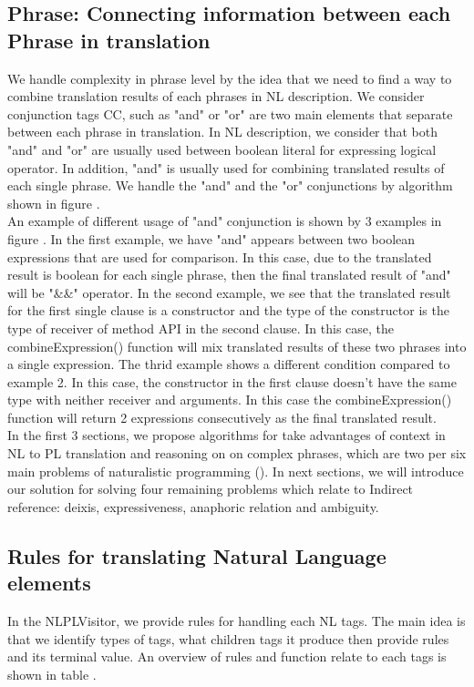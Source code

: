 \subsection{Phrase: Connecting information between each Phrase in translation}
We handle complexity in phrase level by the idea that we need to find a way to combine translation results of each phrases in NL description. We consider conjunction tags CC, such as "and" or "or" are two main elements that separate between each phrase in translation.  In NL description, we consider that both "and" and "or" are usually used between boolean literal for expressing logical operator. In addition, "and" is usually used for combining translated results of each single phrase. We handle the "and" and the "or" conjunctions by algorithm shown in figure \cite{}. \\
An example of different usage of "and" conjunction is shown by 3 examples in figure \cite{}. In the first example, we have "and" appears between two  boolean expressions that are used for comparison. In this case, due to the translated result is boolean for each single phrase, then the final translated result of "and" will be "\&\&" operator. In the second example, we see that the translated result for the first single clause is a constructor and the type of the constructor is the type of receiver of method API in the second clause. In this case, the combineExpression() function will mix translated results of these two phrases into a single expression. The thrid example shows a different condition compared to example 2. In this case, the constructor in the first clause doesn't have the same type with neither receiver and arguments. In this case the combineExpression() function will return 2 expressions consecutively as the final translated result.  \\
In the first 3 sections, we propose algorithms for take advantages of context in NL to PL translation and reasoning on on complex phrases, which are two per six main problems of naturalistic programming (\cite{}). In next sections, we will introduce our solution for solving four remaining problems which relate to Indirect reference: deixis, expressiveness, anaphoric relation and ambiguity.
\subsection{Rules for translating Natural Language elements}
In the NLPLVisitor, we provide rules for handling each NL tags. The main idea is that we identify types of tags, what children tags it produce then provide rules and its terminal value. An overview of rules and function relate to each tags is shown in table \cite{}.
